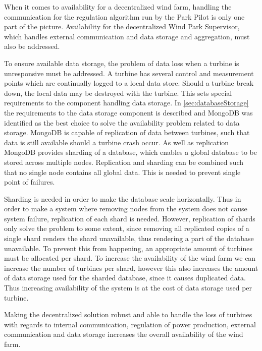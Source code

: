 
When it comes to availability for a decentralized wind farm, handling the communication for the regulation algorithm run by the Park Pilot is only one part of the picture. Availability for the decentralized Wind Park Supervisor, which handles external communication and data storage and aggregation, must also be addressed. 

To ensure available data storage, the problem of data loss when a turbine is unresponsive must be addressed. A turbine has several control and measurement points which are continually logged to a local data store. Should a turbine break down, the local data may be destroyed with the turbine. This sets special requirements to the component handling data storage. In \cref{sec:databaseStorage} the requirements to the data storage component is described and MongoDB was identified as the best choice to solve the availability problem related to data storage. MongoDB is capable of replication of data between turbines, such that data is still available should a turbine crash occur. As well as replication MongoDB provides sharding of a database, which enables a global database to be stored across multiple nodes. Replication and sharding can be combined such that no single node contains all global data. This is needed to prevent single point of failures. 

Sharding is needed in order to make the database scale horizontally. Thus in order to make a system where removing nodes from the system does not cause system failure, replication of each shard is needed. However, replication of shards only solve the problem to some extent, since removing all replicated copies of a single shard renders the shard unavailable, thus rendering a part of the database unavailable. To prevent this from happening, an appropriate amount of turbines must be allocated per shard. To increase the availability of the wind farm we can increase the number of turbines per shard, however this also increases the amount of data storage used for the sharded database, since it causes duplicated data. Thus increasing availability of the system is at the cost of data storage used per turbine.

Making the decentralized solution robust and able to handle the loss of turbines with regards to internal communication, regulation of power production, external communication and data storage increases the overall availability of the wind farm. %

